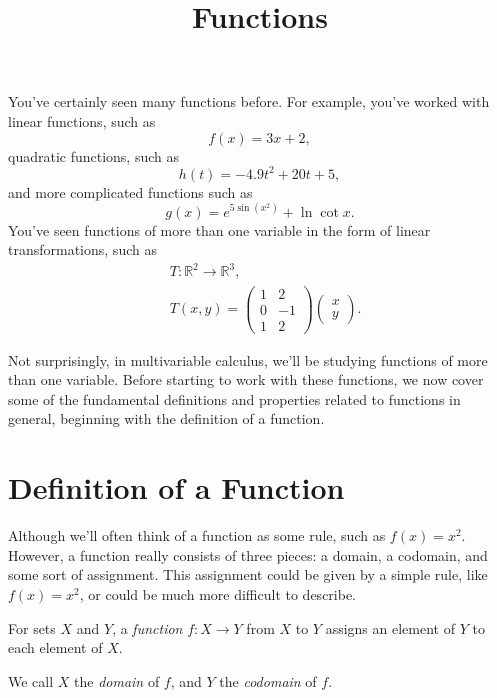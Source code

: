 \documentclass{ximera}
\title{Functions}
\begin{document}
\begin{abstract}
\end{abstract}
\maketitle

You've certainly seen many functions before. For example, you've worked with linear functions, such as
\[
f(x) = 3x+2,
\]
quadratic functions, such as
\[
h(t) = -4.9t^2 + 20t + 5,
\]
and more complicated functions such as
\[
g(x) = e^{5\sin(x^2)}+\ln \cot x.
\]
You've seen functions of more than one variable in the form of linear transformations, such as
\begin{align*}
&T:\mathbb{R}^2\rightarrow\mathbb{R}^3,\\
&T(x,y) = \left(\begin{array}{cc}
1 & 2\\
0 & -1\\
1 & 2
\end{array}\right)
\left(\begin{array}{c}
x\\
y
\end{array}\right).
\end{align*}

Not surprisingly, in multivariable calculus, we'll be studying functions of more than one variable. Before starting to work with these functions, we now cover some of the fundamental definitions and properties related to functions in general, beginning with the definition of a function.

\section*{Definition of a Function}

Although we'll often think of a function as some rule, such as $f(x) = x^2$. However, a function really consists of three pieces: a domain, a codomain, and some sort of assignment. This assignment could be given by a simple rule, like $f(x) = x^2$, or could be much more difficult to describe.

\begin{definition}
For sets $X$ and $Y$, a \emph{function} $f:X\rightarrow Y$ from $X$ to $Y$ assigns an element of $Y$ to each element of $X$.

We call $X$ the \emph{domain} of $f$, and $Y$ the \emph{codomain} of $f$.
\end{definition}
\end{document}
